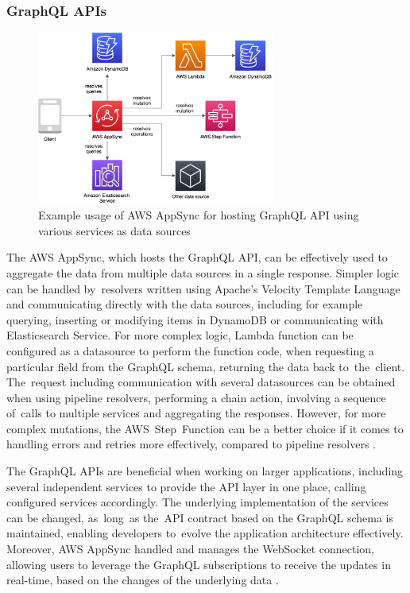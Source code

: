 \subsubsection{GraphQL APIs} \label{chapter:client-graphql-apis}

\begin{figure}[]
   \centering
   \includegraphics[width=0.7\textwidth]{assets/04-serverless-for-web-apps/graphql.png}
   \caption{Example usage of AWS AppSync for hosting GraphQL API using various services as data sources}
   \label{fig:pattern-graphql-api}
\end{figure}

The AWS AppSync, which hosts the GraphQL API, can be effectively used to aggregate the data from multiple data sources in a single response.
Simpler logic can be handled by~resolvers written using Apache’s Velocity Template Language and communicating directly with the data sources, including for example querying, inserting or modifying items in DynamoDB or communicating with Elasticsearch Service.
For more complex logic, Lambda function can be configured as a datasource to perform the function code, when requesting a particular field from the GraphQL schema, returning the data back to~the~client.
The~request including communication with several datasources can be obtained when using pipeline resolvers, performing a chain action, involving a sequence of~calls to multiple services and aggregating the responses.
However, for more complex mutations, the AWS~Step~Function can be a better choice if it comes to handling errors and retries more effectively, compared to pipeline resolvers \cite{ServerlessArchitecturalPatternsAndBestPractices}.

The GraphQL APIs are beneficial when working on larger applications, including several independent services to provide the API layer in one place, calling configured services accordingly.
The underlying implementation of the services can be changed, as~long~as the~API contract based on the GraphQL schema is maintained, enabling developers to~evolve the application architecture effectively.
Moreover, AWS AppSync handled and manages the WebSocket connection, allowing users to leverage the GraphQL subscriptions to receive the updates in real-time, based on the changes of the underlying data \cite{DevelopServerlessGraphQLArchitecturesUsingAWSAppSync}.


